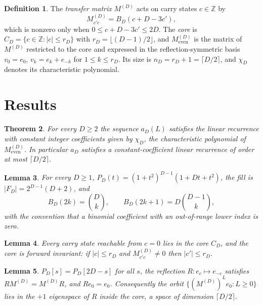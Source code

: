 \documentclass[11pt]{amsart}
\newtheorem{theorem}{Theorem}[section]
\newtheorem{lemma}[theorem]{Lemma}
\theoremstyle{definition}
\newtheorem{definition}[theorem]{Definition}
\theoremstyle{remark}
\begin{document}
\begin{definition}
\label{def:transfer}
The \emph{transfer matrix} $M^{(D)}$ acts on carry states $c \in \mathbb{Z}$ by
\[
M^{(D)}_{c'c} = B_D(c + D - 3c'),
\]
which is nonzero only when $0 \le c+D-3c' \le 2D$. The \emph{core} is $C_D = \{c \in \mathbb{Z} : \lvert c \rvert \le r_D\}$ with $r_D = \lfloor (D-1)/2 \rfloor$, and $M_{\mathrm{even}}^{(D)}$ is the matrix of $M^{(D)}$ restricted to the core and expressed in the reflection-symmetric basis $v_0 = e_0$, $v_k = e_k + e_{-k}$ for $1 \le k \le r_D$. Its size is $n_D = r_D + 1 = \lceil D/2 \rceil$, and $\chi_D$ denotes its characteristic polynomial.
\end{definition}

\section{Results}

\begin{theorem}
\label{thm:order}
For every $D \ge 2$ the sequence $a_D(L)$ satisfies the linear recurrence with constant integer coefficients given by $\chi_D$, the characteristic polynomial of $M_{\mathrm{even}}^{(D)}$. In particular $a_D$ satisfies a constant-coefficient linear recurrence of order at most $\lceil D/2 \rceil$.
\end{theorem}

\begin{lemma}
\label{lem:poly}
For every $D \ge 1$, $P_D(t) = (1+t^2)^{D-1}(1+Dt+t^2)$, the fill is $\lvert F_D \rvert = 2^{D-1}(D+2)$, and
\[
B_D(2k) = \binom{D}{k}, \qquad B_D(2k+1) = D\binom{D-1}{k},
\]
with the convention that a binomial coefficient with an out-of-range lower index is zero.
\end{lemma}

\begin{lemma}
\label{lem:carry}
Every carry state reachable from $c = 0$ lies in the core $C_D$, and the core is forward invariant: if $\lvert c \rvert \le r_D$ and $M^{(D)}_{c'c} \ne 0$ then $\lvert c' \rvert \le r_D$.
\end{lemma}

\begin{lemma}
\label{lem:reflect}
$P_D[s] = P_D[2D-s]$ for all $s$, the reflection $R : e_c \mapsto e_{-c}$ satisfies $RM^{(D)} = M^{(D)}R$, and $Re_0 = e_0$. Consequently the orbit $\{ (M^{(D)})^L e_0 : L \ge 0 \}$ lies in the $+1$ eigenspace of $R$ inside the core, a space of dimension $\lceil D/2 \rceil$.
\end{lemma}
\end{document}
